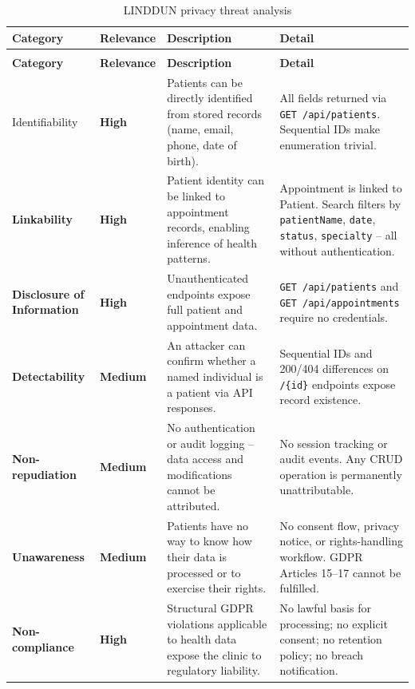 \documentclass[12pt,a4paper]{report}
\newcommand{\high}{\textbf{\textcolor{sevhigh}{High}}}
\newcommand{\medium}{\textbf{\textcolor{sevmedium}{Medium}}}
\begin{document}
\begin{longtable}{>{\bfseries}S{2.8cm} S{1.6cm} S{4.8cm} S{4.4cm}}
\caption{LINDDUN privacy threat analysis}\label{tab:linddun}\\
\toprule
\textbf{Category} & \textbf{Relevance} & \textbf{Description} & \textbf{Detail} \\
\midrule
\endfirsthead
{}\\
\toprule
\textbf{Category} & \textbf{Relevance} & \textbf{Description} & \textbf{Detail} \\
\midrule
\endhead
\bottomrule
\endfoot

Identifiability & \high & Patients can be directly identified from stored records (name, email, phone, date of birth). & All fields returned via \texttt{GET /api/patients}. Sequential IDs make enumeration trivial. \\[6pt]

Linkability & \high & Patient identity can be linked to appointment records, enabling inference of health patterns. & Appointment is linked to Patient. Search filters by \texttt{patientName}, \texttt{date}, \texttt{status}, \texttt{specialty} -- all without authentication. \\[6pt]

Disclosure of Information & \high & Unauthenticated endpoints expose full patient and appointment data. & \texttt{GET /api/patients} and \texttt{GET /api/appointments} require no credentials. \\[6pt]

Detectability & \medium & An attacker can confirm whether a named individual is a patient via API responses. & Sequential IDs and 200/404 differences on \texttt{/\{id\}} endpoints expose record existence. \\[6pt]

Non-repudiation & \medium & No authentication or audit logging -- data access and modifications cannot be attributed. & No session tracking or audit events. Any CRUD operation is permanently unattributable. \\[6pt]

Unawareness & \medium & Patients have no way to know how their data is processed or to exercise their rights. & No consent flow, privacy notice, or rights-handling workflow. GDPR Articles 15--17 cannot be fulfilled. \\[6pt]

Non-compliance & \high & Structural GDPR violations applicable to health data expose the clinic to regulatory liability. & No lawful basis for processing; no explicit consent; no retention policy; no breach notification. \\
\end{longtable}
\end{document}
